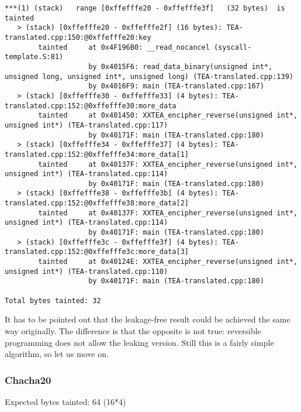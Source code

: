 \documentclass[a4paper,10pt,openright]{memoir}
\begin{document}
\begin{verbatim}
***(1) (stack)	 range [0xffefffe20 - 0xffefffe3f]	 (32 bytes)	 is tainted
   > (stack) [0xffefffe20 - 0xffefffe2f] (16 bytes): TEA-translated.cpp:150:@0xffefffe20:key
        tainted     at 0x4F196B0: __read_nocancel (syscall-template.S:81)
                    by 0x4015F6: read_data_binary(unsigned int*, unsigned long, unsigned int*, unsigned long) (TEA-translated.cpp:139)
                    by 0x4016F9: main (TEA-translated.cpp:167)
   > (stack) [0xffefffe30 - 0xffefffe33] (4 bytes): TEA-translated.cpp:152:@0xffefffe30:more_data
        tainted     at 0x401450: XXTEA_encipher_reverse(unsigned int*, unsigned int*) (TEA-translated.cpp:117)
                    by 0x40171F: main (TEA-translated.cpp:180)
   > (stack) [0xffefffe34 - 0xffefffe37] (4 bytes): TEA-translated.cpp:152:@0xffefffe34:more_data[1]
        tainted     at 0x40137F: XXTEA_encipher_reverse(unsigned int*, unsigned int*) (TEA-translated.cpp:114)
                    by 0x40171F: main (TEA-translated.cpp:180)
   > (stack) [0xffefffe38 - 0xffefffe3b] (4 bytes): TEA-translated.cpp:152:@0xffefffe38:more_data[2]
        tainted     at 0x40137F: XXTEA_encipher_reverse(unsigned int*, unsigned int*) (TEA-translated.cpp:114)
                    by 0x40171F: main (TEA-translated.cpp:180)
   > (stack) [0xffefffe3c - 0xffefffe3f] (4 bytes): TEA-translated.cpp:152:@0xffefffe3c:more_data[3]
        tainted     at 0x40124E: XXTEA_encipher_reverse(unsigned int*, unsigned int*) (TEA-translated.cpp:110)
                    by 0x40171F: main (TEA-translated.cpp:180)

Total bytes tainted: 32
\end{verbatim}

It has to be pointed out that the leakage-free result could be achieved 
the same way originally. The difference is that the opposite is not 
true: reversible programming does not allow the leaking version. Still 
this is a fairly simple algorithm, so let us move on.

\subsubsection{Chacha20}


Expected bytes tainted: 64 (16*4)

\end{document}
